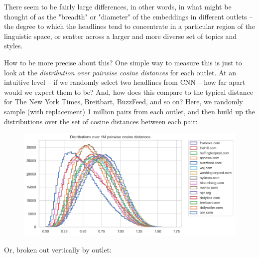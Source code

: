 \documentclass{scrartcl}
\begin{document}
There seem to be fairly large differences, in other words, in what might be thought of as the "breadth" or "diameter" of the embeddings in different outlets -- the degree to which the headlines tend to concentrate in a particular region of the linguistic space, or scatter across a larger and more diverse set of topics and styles.

How to be more precise about this? One simple way to measure this is just to look at the \textit{distribution over pairwise cosine distances} for each outlet. At an intuitive level -- if we randomly select two headlines from CNN -- how far apart would we expect them to be? And, how does this compare to the typical distance for The New York Times, Breitbart, BuzzFeed, and so on? Here, we randomly sample (with replacement) 1 million pairs from each outlet, and then build up the distributions over the set of cosine distances between each pair:

\begin{figure}[H]
  \centering
  \includegraphics[width=\textwidth]{figures/pwd-hist.png}
\end{figure}

Or, broken out vertically by outlet:
\end{document}
